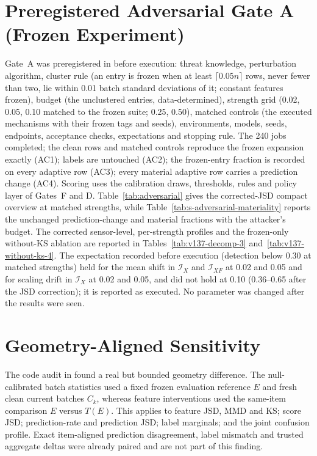 \documentclass[10pt,journal,compsoc]{IEEEtran}
\newcommand{\IX}{\mathcal I_X}
\newcommand{\IXF}{\mathcal I_{XF}}
\begin{document}
\section{Preregistered Adversarial Gate A (Frozen Experiment)}
\label{sec:gate-a}

Gate~A was preregistered in  before
execution: threat knowledge, perturbation algorithm, cluster rule (an entry
is frozen when at least $\lceil0.05n\rceil$ rows, never fewer than two, lie
within 0.01 batch standard deviations of it; constant features frozen),
budget (the unclustered entries, data-determined), strength grid
(0.02, 0.05, 0.10 matched to the frozen suite; 0.25, 0.50), matched controls
(the executed mechanisms with their frozen tags and seeds), environments,
models, seeds, endpoints, acceptance checks, expectations and stopping rule.
The 240 jobs completed; the clean rows and matched controls reproduce the
frozen expansion exactly (AC1); labels are untouched (AC2); the frozen-entry
fraction is recorded on every adaptive row (AC3); every material adaptive row
carries a prediction change (AC4). Scoring uses the calibration draws,
thresholds, rules and policy layer of Gates~F and D.
Table~\ref{tab:adversarial} gives the corrected-JSD compact overview at
matched strengths, while Table~\ref{tab:s-adversarial-materiality} reports
the unchanged prediction-change and material fractions with the attacker's
budget.  The corrected sensor-level, per-strength profiles and the frozen-only
without-KS ablation are reported in
Tables~\ref{tab:v137-decomp-3} and~\ref{tab:v137-without-ks-4}. The expectation recorded
before execution (detection below 0.30 at matched strengths) held for the
mean shift in $\IX$ and $\IXF$ at 0.02 and 0.05 and for scaling drift in
$\IX$ at 0.02 and 0.05, and did not hold at 0.10 (0.36--0.65 after the JSD correction); it is reported
as executed. No parameter was changed after the results were seen.




\section{Geometry-Aligned Sensitivity}
\label{sec:geometry-sensitivity}

The code audit in
 found a real but bounded
geometry difference. The null-calibrated batch statistics used a fixed frozen
evaluation reference $E$ and fresh clean current batches $C_k$, whereas
feature interventions used the same-item comparison $E$ versus $T(E)$. This
applies to feature JSD, MMD and KS; score JSD; prediction-rate and prediction
JSD; label marginals; and the joint confusion profile. Exact item-aligned
prediction disagreement, label mismatch and trusted aggregate deltas were
already paired and are not part of this finding.
\end{document}
